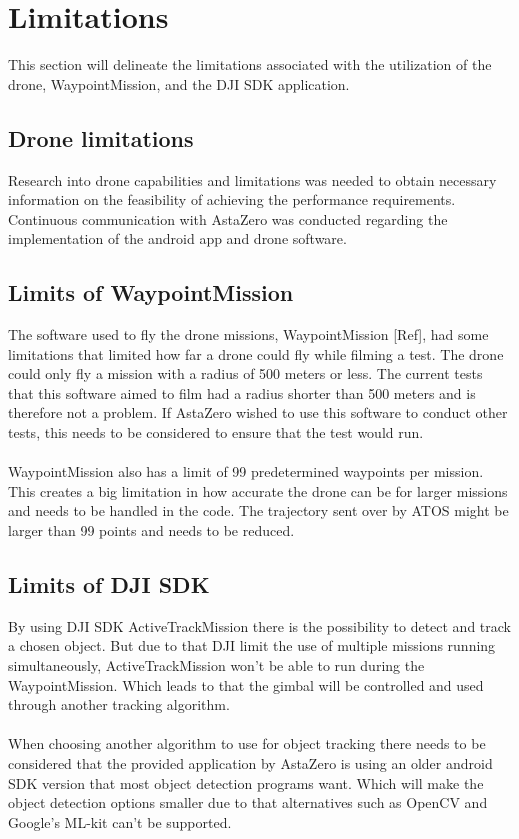 \section{Limitations}
This section will delineate the limitations associated with the utilization of the drone, WaypointMission, and the DJI SDK application.


\subsection{Drone limitations}
Research into drone capabilities and limitations was needed to obtain necessary information on the feasibility of achieving the performance requirements. Continuous communication with AstaZero was conducted regarding the implementation of the android app and drone software.

\subsection{Limits of WaypointMission}
The software used to fly the drone missions, WaypointMission [Ref], had some limitations that limited how far a drone could fly while filming a test. The drone could only fly a mission with a radius of 500 meters or less. The current tests that this software aimed to film had a radius shorter than 500 meters and is therefore not a problem. If AstaZero wished to use this software to conduct other tests, this needs to be considered to ensure that the test would run.
\\ \\
WaypointMission also has a limit of 99 predetermined waypoints per mission. This creates a big limitation in how accurate the drone can be for larger missions and needs to be handled in the code. The trajectory sent over by ATOS might be larger than 99 points and needs to be reduced. 

\subsection{Limits of DJI SDK}
By using DJI SDK ActiveTrackMission there is the possibility to detect and track a chosen object. But due to that DJI limit the use of multiple missions running simultaneously, ActiveTrackMission won't be able to run during the WaypointMission. Which leads to that the gimbal will be controlled and used through another tracking algorithm. 
\\ \\
When choosing another algorithm to use for object tracking there needs to be considered that the provided application by AstaZero is using an older android SDK version that most object detection programs want. Which will make the object detection options smaller due to that alternatives such as OpenCV and Google's ML-kit can't be supported.

